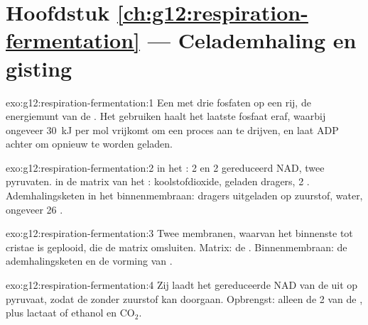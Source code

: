 \section*{Hoofdstuk \ref{ch:g12:respiration-fermentation} --- Celademhaling en gisting}

\begin{solution}{exo:g12:respiration-fermentation:1}
Een  met drie fosfaten op een rij, de energiemunt van de .
Het gebruiken haalt het laatste fosfaat eraf, waarbij ongeveer
\qty{30}{kJ} per mol vrijkomt om een proces aan te drijven, en laat ADP
achter om opnieuw te worden geladen.
\end{solution}

\begin{solution}{exo:g12:respiration-fermentation:2}
 in het : 2  en 2 gereduceerd NAD, twee pyruvaten.
 in de matrix van het : koolstofdioxide, geladen
dragers, 2 . Ademhalingsketen in het binnenmembraan: dragers uitgeladen
op zuurstof, water, ongeveer 26 .
\end{solution}

\begin{solution}{exo:g12:respiration-fermentation:3}
Twee membranen, waarvan het binnenste tot cristae is geplooid, die de
matrix omsluiten. Matrix: de . Binnenmembraan: de
ademhalingsketen en de vorming van .
\end{solution}

\begin{solution}{exo:g12:respiration-fermentation:4}
Zij laadt het gereduceerde NAD van de  uit op pyruvaat, zodat de
 zonder zuurstof kan doorgaan. Opbrengst: alleen de 2  van de
, plus lactaat of ethanol en $\mathrm{CO_2}$.
\end{solution}

